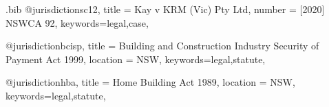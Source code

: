 

\begin{filecontents*}{\jobname.bib}
@jurisdiction{sc12,
title = {Kay v KRM (Vic) Pty Ltd},
number = {[2020] NSWCA 92},
keywords={legal,case},
}

@jurisdiction{bcisp,
title = {Building and Construction Industry Security of Payment Act 1999},
location = {NSW},
keywords={legal,statute},
}

@jurisdiction{hba,
title = {Home Building Act 1989},
location = {NSW},
keywords={legal,statute},
}

\end{filecontents*}



\documentclass[12pt,varwidth,border=6pt]{standalone}
\newcommand\rulesep{\rule{0.4\textwidth}{.4pt}}
\usepackage[table]{xcolor}
\pagecolor{blue!3}
\usepackage{fontspec}
\setmainfont{Noto Serif}




\newcommand\abibname{ext-authortitle-ibid}
\newcommand\abibstyle{style=\abibname}
\usepackage[
	\abibstyle , 
	indexing=cite,
	citetracker=true,
	ibidtracker=true,
	pagetracker=true,
	idemtracker=true,
	opcittracker=true,
	loccittracker=true,
	autocite=footnote,
		]{biblatex}




				



